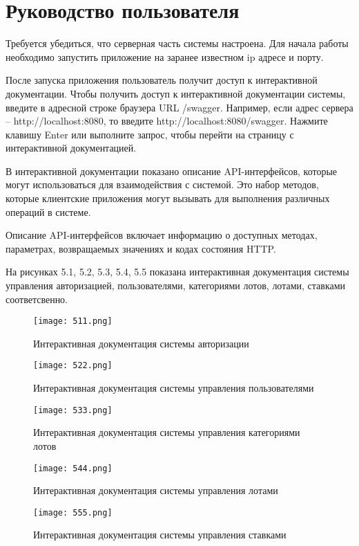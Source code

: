 \section{Руководство пользователя}

Требуется убедиться, что серверная часть системы настроена. Для
начала работы необходимо запустить приложение на заранее известном ip адресе и порту. 

После запуска приложения пользователь получит доступ к интерактивной документации.
Чтобы получить доступ к интерактивной документации системы,
введите в адресной строке браузера URL /swagger. Например, если адрес
сервера – http://localhost:8080, то введите http://localhost:8080/swagger.
Нажмите клавишу Enter или выполните запрос, чтобы перейти на страницу с
интерактивной документацией.

В интерактивной документации показано описание
API-интерфейсов, которые могут использоваться для взаимодействия с
системой. Это набор методов, которые клиентские приложения могут
вызывать для выполнения различных операций в системе.

Описание API-интерфейсов включает информацию о доступных
методах, параметрах, возвращаемых значениях и кодах состояния HTTP.

На рисунках 5.1, 5.2, 5.3, 5.4, 5.5 показана интерактивная документация системы управления авторизацией, 
пользователями, категориями лотов, лотами, ставками соответсвенно.
\begin{figure}[h]
\centering
\texttt{[image: 511.png]}
\caption{Интерактивная документация системы авторизации}
\end{figure}

\begin{figure}[h]
\centering
\texttt{[image: 522.png]}
\caption{Интерактивная документация системы управления пользователями}
\end{figure}

\begin{figure}[h]
\centering
\texttt{[image: 533.png]}
\caption{Интерактивная документация системы управления категориями лотов}
\end{figure}

\begin{figure}[h]
\centering
\texttt{[image: 544.png]}
\caption{Интерактивная документация системы управления лотами}
\end{figure}

\begin{figure}[h]
\centering
\texttt{[image: 555.png]}
\caption{Интерактивная документация системы управления ставками}
\end{figure}